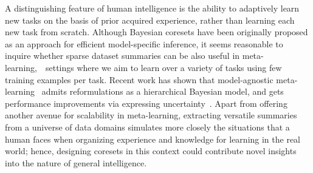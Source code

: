 A distinguishing feature of human intelligence is the ability to adaptively learn new tasks on the basis of prior acquired experience, rather than learning each new task from scratch. Although Bayesian coresets have been originally proposed as an approach for efficient model-specific inference, it seems reasonable to inquire whether sparse dataset summaries can be also useful in meta-learning,~\ie~settings where we aim to learn over a variety of tasks using few training examples per task. Recent work has shown that model-agnostic meta-learning~\citep{finn17} admits reformulations as a hierarchical Bayesian model, and gets performance improvements via expressing uncertainty~\citep{grant18,finn18}. Apart from offering another avenue for scalability in meta-learning, extracting versatile summaries from a universe of data domains simulates more closely the situations that a human faces when organizing experience and knowledge for learning in the real world; hence, designing coresets in this context could contribute novel insights into the nature of general intelligence.

